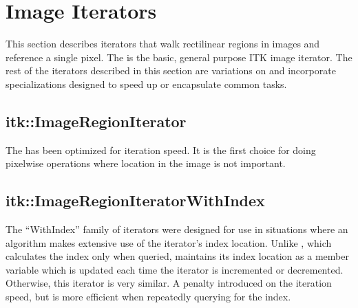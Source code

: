 



\section{Image Iterators}
\label{sec:ImageIterators}
This section describes iterators that walk rectilinear regions in images and
reference a single pixel.  The  is the basic,
general purpose ITK image iterator.  The rest of the
iterators described in this section are variations on
 and incorporate specializations designed to 
speed up or encapsulate common tasks.


\subsection{itk::ImageRegionIterator}
\label{sec:itkImageRegionIterator}


The  has been optimized for iteration speed.  It
is the first choice for doing pixelwise operations where location in the image
is not important.  

\subsection{itk::ImageRegionIteratorWithIndex}
\label{sec:itkImageRegionIteratorWithIndex}
The ``WithIndex'' family of iterators were designed for use in situations where
an algorithm makes extensive use of the iterator's index location. Unlike
, which calculates the index only when queried,
 maintains its index location as a member variable
which is updated each time the iterator is incremented or decremented.
Otherwise, this iterator is very similar.  A penalty introduced on the
iteration speed, but is more efficient when repeatedly querying for the index.

